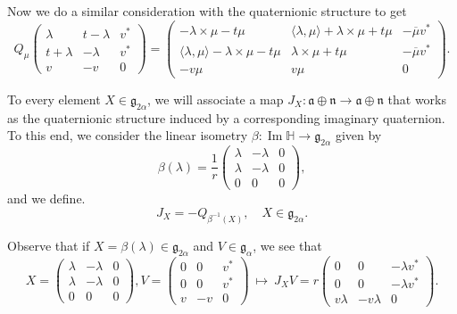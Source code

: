 \documentclass[12pt, a4paper,draft]{amsart}
\newcommand{\g}{\mathfrak}
\renewcommand{\H}{\mathbb{H}}
\renewcommand{\Im}{\operatorname{Im}}
\theoremstyle{remark}
\begin{document}
Now we do a similar consideration with the quaternionic structure to get 
\[
Q_{\mu}\left(
\begin{array}{cc|c}
	\lambda & t-\lambda & v^{*} \\
	t+\lambda & -\lambda & v^{*} \\
	\hline
	v & -v & 0
\end{array}
\right)
=\left(
\begin{array}{cc|c}
-\lambda\times\mu-t\mu & \langle\lambda,\mu\rangle+\lambda\times\mu+t\mu & -\overline{\mu}v^{*} \\
\langle\lambda,\mu\rangle-\lambda\times\mu-t\mu & \lambda\times\mu+t\mu & -\overline{\mu}v^{*} \\
\hline
-v\mu & v\mu & 0
\end{array}
\right).
\]

To every element $X\in\g{g}_{2\alpha}$, we will associate a map $J_{X}\colon\g{a}\oplus\g{n}\to\g{a}\oplus\g{n}$ that works as the quaternionic structure induced by a corresponding imaginary quaternion.
To this end, we consider the linear isometry $\beta\colon\Im\H\to\g{g}_{2\alpha}$ given by
\begin{equation*}
	\beta(\lambda)=\frac{1}{r}\left(
	\begin{array}{cc|c}
		\lambda & -\lambda & 0 \\
		\lambda & -\lambda & 0 \\
		\hline
		0 & 0 & 0
	\end{array}
	\right),
\end{equation*}
and we define.
\begin{equation*}
	J_{X}=-Q_{\beta^{-1}(X)}, \quad X\in\g{g}_{2\alpha}.
\end{equation*}

Observe that if $X=\beta(\lambda)\in\g{g}_{2\alpha}$ and $V\in\g{g}_{\alpha}$, we see that
\begin{equation*}
X=\left(
\begin{array}{cc|c}
	\lambda & -\lambda & 0 \\
	\lambda & -\lambda & 0 \\
	\hline
	0 & 0 & 0
\end{array}
\right),
V=\left(
	\begin{array}{cc|c}
		0 & 0 & v^{*} \\
		0 & 0 & v^{*} \\
		\hline
		v & -v & 0
	\end{array}
\right)\ 
\mapsto\
J_{X}V=r\left(
	\begin{array}{cc|c}
		0 & 0 & -\lambda v^{*} \\
		0 & 0 & -\lambda v^{*} \\
		\hline
		v\lambda & -v\lambda & 0
	\end{array}
\right).
\end{equation*}
\end{document}
